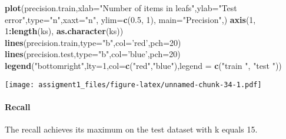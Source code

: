 \documentclass[
]{article}
\newenvironment{Shaded}{\begin{snugshade}}{\end{snugshade}}
\newcommand{\DataTypeTok}[1]{\textcolor[rgb]{0.13,0.29,0.53}{#1}}
\newcommand{\DecValTok}[1]{\textcolor[rgb]{0.00,0.00,0.81}{#1}}
\newcommand{\FloatTok}[1]{\textcolor[rgb]{0.00,0.00,0.81}{#1}}
\newcommand{\KeywordTok}[1]{\textcolor[rgb]{0.13,0.29,0.53}{\textbf{#1}}}
\newcommand{\NormalTok}[1]{#1}
\newcommand{\OperatorTok}[1]{\textcolor[rgb]{0.81,0.36,0.00}{\textbf{#1}}}
\newcommand{\StringTok}[1]{\textcolor[rgb]{0.31,0.60,0.02}{#1}}
\begin{document}
\begin{Shaded}
\begin{Highlighting}[]
\KeywordTok{plot}\NormalTok{(precision.train,}\DataTypeTok{xlab=}\StringTok{"Number of items in leafs"}\NormalTok{,}\DataTypeTok{ylab=}\StringTok{"Test error"}\NormalTok{,}\DataTypeTok{type=}\StringTok{"n"}\NormalTok{,}\DataTypeTok{xaxt=}\StringTok{"n"}\NormalTok{, }\DataTypeTok{ylim=}\KeywordTok{c}\NormalTok{(}\FloatTok{0.5}\NormalTok{, }\DecValTok{1}\NormalTok{),  }\DataTypeTok{main=}\StringTok{"Precision"}\NormalTok{,)}
\KeywordTok{axis}\NormalTok{(}\DecValTok{1}\NormalTok{, }\DecValTok{1}\OperatorTok{:}\KeywordTok{length}\NormalTok{(ks), }\KeywordTok{as.character}\NormalTok{(ks))}
\KeywordTok{lines}\NormalTok{(precision.train,}\DataTypeTok{type=}\StringTok{"b"}\NormalTok{,}\DataTypeTok{col=}\StringTok{'red'}\NormalTok{,}\DataTypeTok{pch=}\DecValTok{20}\NormalTok{)}
\KeywordTok{lines}\NormalTok{(precision.test,}\DataTypeTok{type=}\StringTok{"b"}\NormalTok{,}\DataTypeTok{col=}\StringTok{'blue'}\NormalTok{,}\DataTypeTok{pch=}\DecValTok{20}\NormalTok{)}
\KeywordTok{legend}\NormalTok{(}\StringTok{"bottomright"}\NormalTok{,}\DataTypeTok{lty=}\DecValTok{1}\NormalTok{,}\DataTypeTok{col=}\KeywordTok{c}\NormalTok{(}\StringTok{"red"}\NormalTok{,}\StringTok{"blue"}\NormalTok{),}\DataTypeTok{legend =} \KeywordTok{c}\NormalTok{(}\StringTok{"train "}\NormalTok{, }\StringTok{"test "}\NormalTok{))}
\end{Highlighting}
\end{Shaded}

\texttt{[image: assigment1\_files/figure-latex/unnamed-chunk-34-1.pdf]}

\hypertarget{recall-1}{%
\paragraph{Recall}\label{recall-1}}

The recall achieves its maximum on the test dataset with k equals 15.
\end{document}

